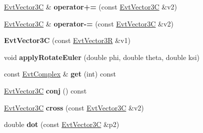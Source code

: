 \begin{DoxyCompactItemize}
\item 
\hypertarget{class_evt_vector3_c_a9ff43ba8f4b92cd0254c7b7e05d775bd}{}\hyperlink{class_evt_vector3_c}{Evt\+Vector3\+C} \& {\bfseries operator+=} (const \hyperlink{class_evt_vector3_c}{Evt\+Vector3\+C} \&v2)\label{class_evt_vector3_c_a9ff43ba8f4b92cd0254c7b7e05d775bd}

\item 
\hypertarget{class_evt_vector3_c_a8a2ebae72afe0ee778b3eeea8cf2573b}{}\hyperlink{class_evt_vector3_c}{Evt\+Vector3\+C} \& {\bfseries operator-\/=} (const \hyperlink{class_evt_vector3_c}{Evt\+Vector3\+C} \&v2)\label{class_evt_vector3_c_a8a2ebae72afe0ee778b3eeea8cf2573b}

\item 
\hypertarget{class_evt_vector3_c_afae908a8dad130b2986057ffaf71899c}{}{\bfseries Evt\+Vector3\+C} (const \hyperlink{class_evt_vector3_r}{Evt\+Vector3\+R} \&v1)\label{class_evt_vector3_c_afae908a8dad130b2986057ffaf71899c}

\item 
\hypertarget{class_evt_vector3_c_ae66331ffa9e3dc37dc56a284d71119e9}{}void {\bfseries apply\+Rotate\+Euler} (double phi, double theta, double ksi)\label{class_evt_vector3_c_ae66331ffa9e3dc37dc56a284d71119e9}

\item 
\hypertarget{class_evt_vector3_c_a5f274597f9b10a4587476290711f747d}{}const \hyperlink{class_evt_complex}{Evt\+Complex} \& {\bfseries get} (int) const \label{class_evt_vector3_c_a5f274597f9b10a4587476290711f747d}

\item 
\hypertarget{class_evt_vector3_c_af1bac5964c7fc4ea22075e01d996fc4e}{}\hyperlink{class_evt_vector3_c}{Evt\+Vector3\+C} {\bfseries conj} () const \label{class_evt_vector3_c_af1bac5964c7fc4ea22075e01d996fc4e}

\item 
\hypertarget{class_evt_vector3_c_a948bd0afd66f6bd655a9bbea7c23e653}{}\hyperlink{class_evt_vector3_c}{Evt\+Vector3\+C} {\bfseries cross} (const \hyperlink{class_evt_vector3_c}{Evt\+Vector3\+C} \&v2)\label{class_evt_vector3_c_a948bd0afd66f6bd655a9bbea7c23e653}

\item 
\hypertarget{class_evt_vector3_c_a92ef786b38478d32c1cf3aa0ac6f130d}{}double {\bfseries dot} (const \hyperlink{class_evt_vector3_c}{Evt\+Vector3\+C} \&p2)\label{class_evt_vector3_c_a92ef786b38478d32c1cf3aa0ac6f130d}

\end{DoxyCompactItemize}
